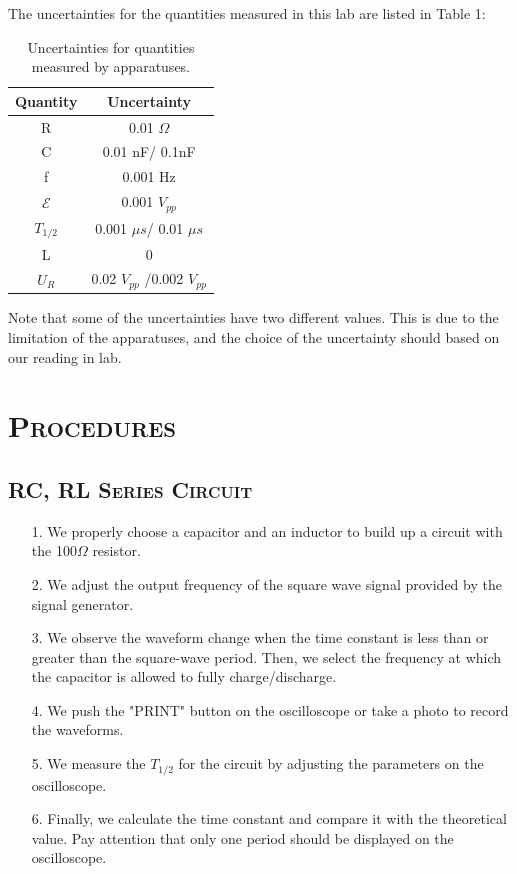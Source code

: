 \documentclass[a4paper,12pt]{article}
\begin{document}
The uncertainties for the quantities measured in this lab are listed in Table 1:

\begin{table}[htbb]
\begin{center}
\begin{tabular}{|c|c|}
\hline
Quantity & Uncertainty \\ \hline
R        & 0.01 $\Omega$       \\ \hline
C        & 0.01 nF/ 0.1nF       \\ \hline
f        & 0.001 Hz      \\ \hline
$\mathcal{E}$     & 0.001 $V_{pp}$      \\ \hline
$T_{1/2}$        & 0.001 $\mu s$/ 0.01 $\mu s$      \\ \hline
L        & 0           \\ \hline
$U_R$        & 0.02 $V_{pp}$ /0.002 $V_{pp}$      \\ \hline
\end{tabular}
\caption{Uncertainties for quantities measured by apparatuses.}
\end{center}
\end{table}

Note that some of the uncertainties have two different values. This is due to the limitation of the apparatuses, and the choice of the uncertainty should based on our reading in lab.

\section{\textsc{Procedures \cite{labmanual}}}
\subsection{\textsc{RC, RL Series Circuit}}
\begin{itemize}
\item[1.] We properly choose a capacitor and an inductor to build up a circuit with the 100$\Omega$ resistor.
\item[2.] We adjust the output frequency of the square wave signal provided by the signal generator.
\item[3.] We observe the waveform change when the time constant is less than or greater than the square-wave period. Then, we select the frequency at which the capacitor is allowed to fully charge/discharge.
\item[4.] We push the "PRINT" button on the oscilloscope or take a photo to record the waveforms.
\item[5.] We measure the $T_{1/2}$ for the circuit by adjusting the parameters on the oscilloscope.
\item[6.] Finally, we calculate the time constant and compare it with the theoretical value. Pay attention that only one period should be displayed on the oscilloscope.
\end{itemize}
\end{document}
